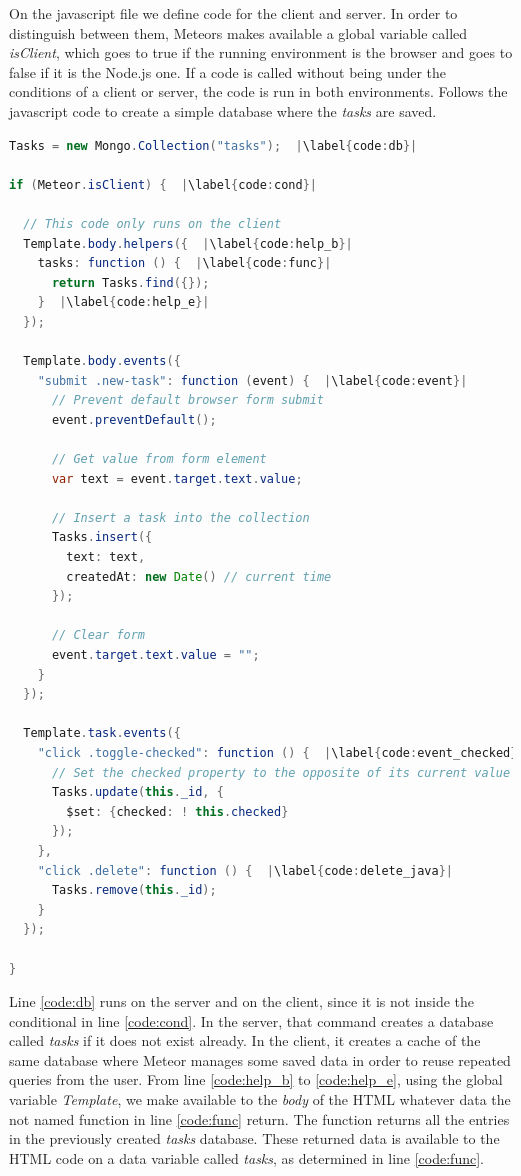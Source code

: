 On the javascript file we define code for the client and server.
In order to distinguish between them, Meteors makes available a global variable called \emph{isClient}, which goes to true if the running environment is the browser and goes to false if it is the Node.js one.
If a code is called without being under the conditions of a client or server, the code is run in both environments.
Follows the javascript code to create a simple database where the \emph{tasks} are saved.

\begin{lstlisting}[language=java,escapechar=|]
Tasks = new Mongo.Collection("tasks");  |\label{code:db}|
 
if (Meteor.isClient) {  |\label{code:cond}|

  // This code only runs on the client
  Template.body.helpers({  |\label{code:help_b}|
    tasks: function () {  |\label{code:func}|
      return Tasks.find({});
    }  |\label{code:help_e}|
  });
  
  Template.body.events({
    "submit .new-task": function (event) {  |\label{code:event}|
      // Prevent default browser form submit
      event.preventDefault();
 
      // Get value from form element
      var text = event.target.text.value;
 
      // Insert a task into the collection
      Tasks.insert({
        text: text,
        createdAt: new Date() // current time
      });
 
      // Clear form
      event.target.text.value = "";
    }
  });
  
  Template.task.events({
    "click .toggle-checked": function () {  |\label{code:event_checked}|
      // Set the checked property to the opposite of its current value
      Tasks.update(this._id, {
        $set: {checked: ! this.checked}
      });
    },
    "click .delete": function () {  |\label{code:delete_java}|
      Tasks.remove(this._id);
    }
  });
  
}
\end{lstlisting}

Line \ref{code:db} runs on the server and on the client, since it is not inside the conditional in line \ref{code:cond}.
In the server, that command creates a database called \emph{tasks} if it does not exist already.
In the client, it creates a cache of the same database where Meteor manages some saved data in order to reuse repeated queries from the user.
From line \ref{code:help_b} to \ref{code:help_e}, using the global variable \emph{Template}, we make available to the \emph{body} of the HTML whatever data the not named function in line \ref{code:func} return.
The function returns all the entries in the previously created \emph{tasks} database.
These returned data is available to the HTML code on a data variable called \emph{tasks}, as determined in line \ref{code:func}.

